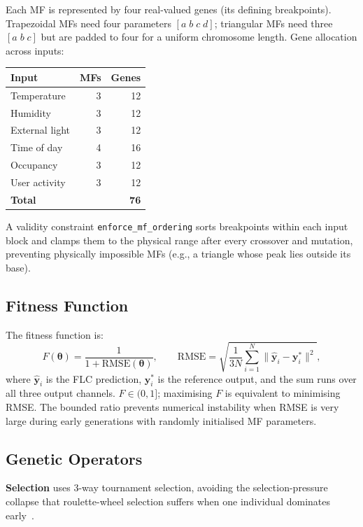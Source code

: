 \documentclass[10pt,twocolumn,a4paper]{article}
\begin{document}
Each MF is represented by four real-valued genes (its defining breakpoints). Trapezoidal MFs need four parameters $[a\;b\;c\;d]$; triangular MFs need three $[a\;b\;c]$ but are padded to four for a uniform chromosome length. Gene allocation across inputs:
\begin{center}
  \scriptsize
  \begin{tabular}{lrr}
    \toprule
    Input & MFs & Genes \\
    \midrule
    Temperature    & 3 & 12 \\
    Humidity       & 3 & 12 \\
    External light & 3 & 12 \\
    Time of day    & 4 & 16 \\
    Occupancy      & 3 & 12 \\
    User activity  & 3 & 12 \\
    \midrule
    \textbf{Total} &   & \textbf{76} \\
    \bottomrule
  \end{tabular}
\end{center}
A validity constraint \texttt{enforce\_mf\_ordering} sorts breakpoints within each input block and clamps them to the physical range after every crossover and mutation, preventing physically impossible MFs (e.g., a triangle whose peak lies outside its base).

\subsection{Fitness Function}

The fitness function is:
\begin{equation}
  F(\bm{\theta}) = \frac{1}{1 + \mathrm{RMSE}(\bm{\theta})},
  \qquad
  \mathrm{RMSE} = \sqrt{\frac{1}{3N}\sum_{i=1}^{N}\|\hat{\bm{y}}_i - \bm{y}_i^*\|^2},
\end{equation}
where $\hat{\bm{y}}_i$ is the FLC prediction, $\bm{y}_i^*$ is the reference output, and the sum runs over all three output channels. $F \in (0,1]$; maximising $F$ is equivalent to minimising RMSE. The bounded ratio prevents numerical instability when RMSE is very large during early generations with randomly initialised MF parameters.

\subsection{Genetic Operators}

\textbf{Selection} uses 3-way tournament selection, avoiding the selection-pressure collapse that roulette-wheel selection suffers when one individual dominates early~\cite{deb2002}.
\end{document}
